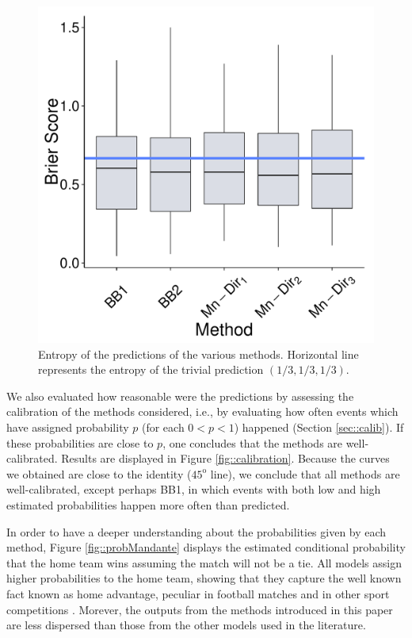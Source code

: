 \documentclass[journal,article,accept,moreauthors,pdftex,12pt,a4paper]{mdpi}
\begin{document}
    \begin{figure}[H]
        \centering
        \includegraphics[page=10,scale=0.3]{futebolComparacaoModelosForPaper.pdf}
        \caption{Entropy of the predictions of the various methods. Horizontal line represents the entropy of the trivial prediction $(1/3,1/3,1/3)$.}
        \label{fig::entropy}
    \end{figure}


    We also evaluated how reasonable were the predictions by assessing the calibration of the methods considered, i.e., by evaluating how often events which have assigned probability $p$ (for each $0<p<1$) happened (Section \ref{sec::calib}).
    If these probabilities are close to $p$, one concludes that the methods are well-calibrated.
    Results are displayed in Figure \ref{fig::calibration}.
    Because the curves we obtained are close to the identity ($45^{\text{o}}$ line), we conclude that all methods are well-calibrated, except perhaps BB1, in which events with both low and high estimated probabilities happen more often
    than predicted.

    In order to have a deeper understanding about the probabilities
    given by each method, Figure \ref{fig::probMandante} displays the
    estimated conditional probability that the home team wins assuming
    the match will not be a tie.
    All models assign higher probabilities to the home team, showing that they capture the well known fact known as home advantage, peculiar in football matches and in other sport competitions \cite{Pollard86, Clarke95, Nevill99}.
    Morever, the outputs from the methods introduced in this paper are
    less dispersed than those from the other models used in the
    literature.
\end{document}
